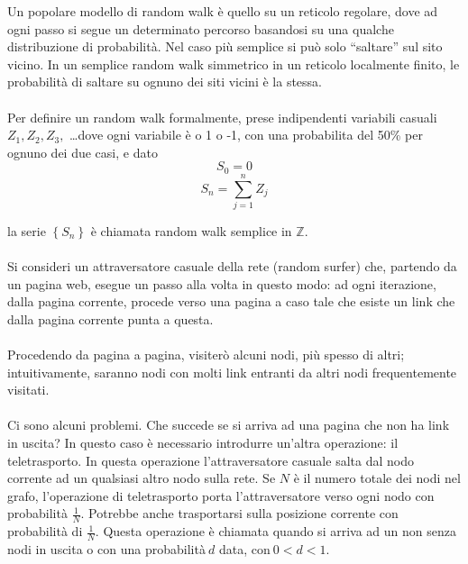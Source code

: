 Un popolare modello di random walk è quello su un reticolo regolare, dove ad ogni passo si segue un determinato percorso basandosi su una qualche distribuzione di probabilità. Nel caso più semplice si può solo “saltare” sul sito vicino. In un semplice random walk simmetrico in un reticolo localmente finito, le probabilità di saltare su ognuno dei siti vicini è la stessa.
\\\\
Per definire un random walk formalmente, prese indipendenti variabili casuali $ Z_1, Z_2, Z_3, $ \dots dove ogni variabile è o 1 o -1, con una probabilita del 50\% per ognuno dei due casi, e dato 
\begin{equation}
  S_0 = 0
\end{equation}
\begin{equation}
  S_n = \sum_{j=1}^{n} Z_j
\end{equation}
  
la serie $\left \{ S_n \right \} $ è chiamata random walk semplice in $\mathbb{Z}$.
\\\\
Si consideri un attraversatore casuale della rete (random surfer) che, partendo da un pagina web, esegue un passo alla volta in questo modo: ad ogni iterazione, dalla pagina corrente, procede verso una pagina a caso tale che esiste un link che dalla pagina corrente punta a questa.
\\\\
Procedendo da pagina a pagina, visiterò alcuni nodi, più spesso di altri; intuitivamente, saranno nodi con molti link entranti da altri nodi frequentemente visitati.
\\\\
Ci sono alcuni problemi. Che succede se si arriva ad una pagina che non ha link in uscita? In questo caso è necessario introdurre un’altra operazione: il teletrasporto. In questa operazione l’attraversatore casuale salta dal nodo corrente ad un qualsiasi altro nodo sulla rete.
Se $N$ è il numero totale dei nodi nel grafo, l’operazione di teletrasporto porta l’attraversatore verso ogni nodo con probabilità $\frac{1}{N}$. Potrebbe anche trasportarsi sulla posizione corrente con probabilità di $\frac{1}{N}$. Questa operazione è chiamata quando si arriva ad un non senza nodi in uscita o con una probabilità$\ d$ data, con$\ 0 < d < 1$.


